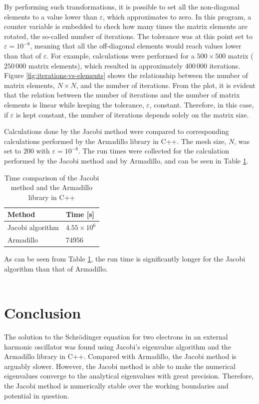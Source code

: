 \documentclass[12pt, a4paper, reqno, article]{amsart}
\begin{document}
By performing such transformations, it is possible to set all the non-diagonal elements to a value lower than $\varepsilon$, which approximates to zero. In this program, a counter variable is embedded to check how many times the matrix elements are rotated, the so-called number of iterations. The tolerance was at this point set to $\varepsilon = 10^{-8}$, meaning that all the off-diagonal elements would reach values lower than that of $\varepsilon$. For example, calculations were performed for a $500 \times 500$ matrix ($250\,000$ matrix elements), which resulted in approximately $400\,000$ iterations. Figure \ref{fig:iterations-vs-elements} shows the relationship between the number of matrix elements, $N \times N$, and the number of iterations. From the plot, it is evident that the relation between the number of iterations and the number of matrix elements is linear while keeping the tolerance, $\varepsilon$, constant. Therefore, in this case, if $\varepsilon$ is kept constant, the number of iterations depends solely on the matrix size.

Calculations done by the Jacobi method were compared to corresponding calculations performed by the Armadillo library in C++. The mesh size, $N$, was set to $200$ with $\varepsilon = 10^{-8}$. The run times were collected for the calculation performed by the Jacobi method and by Armadillo, and can be seen in Table \ref{tab:time}.

\begin{table}[h]
\centering
\caption{Time comparison of the Jacobi method and the Armadillo library in C++}
\label{tab:time}
\begin{tabular}{|l|l|}
\hline
\textbf{Method}  & \textbf{Time {[}s{]}} \\ \hline
Jacobi algorithm & $4.55\times{10^6}$               \\ \hline
Armadillo        & $74956$                \\ \hline
\end{tabular}
\end{table}

As can be seen from Table \ref{tab:time}, the run time is significantly longer for the Jacobi algorithm than that of Armadillo.
\\
\\

\section{Conclusion}
The solution to the Schrödinger equation for two electrons in an external harmonic oscillator was found using Jacobi's eigenvalue algorithm and the Armadillo library in C++. Compared with Armadillo, the Jacobi method is arguably slower. However, the Jacobi method is able to make the numerical eigenvalues converge to the analytical eigenvalues with great precision. Therefore, the Jacobi method is numerically stable over the working boundaries and potential in question.
\end{document}
